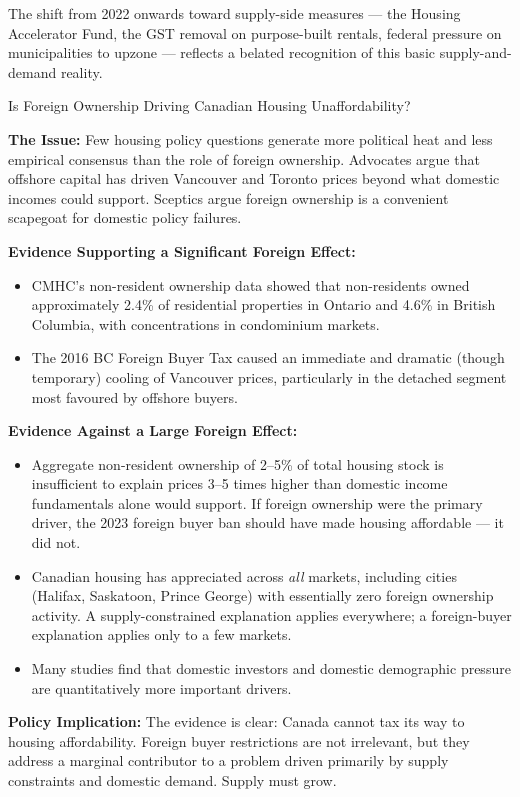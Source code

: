 The shift from 2022 onwards toward supply-side measures --- the Housing
Accelerator Fund, the GST removal on purpose-built rentals, federal pressure
on municipalities to upzone --- reflects a belated recognition of this basic
supply-and-demand reality.

\begin{policydebate}{Is Foreign Ownership Driving Canadian Housing Unaffordability?}

\textbf{The Issue:} Few housing policy questions generate more political
heat and less empirical consensus than the role of foreign ownership. Advocates
argue that offshore capital has driven Vancouver and Toronto prices beyond
what domestic incomes could support. Sceptics argue foreign ownership is a
convenient scapegoat for domestic policy failures.

\textbf{Evidence Supporting a Significant Foreign Effect:}
\begin{itemize}
  \item CMHC's non-resident ownership data showed that non-residents owned
        approximately 2.4\% of residential properties in Ontario and 4.6\%
        in British Columbia, with concentrations in condominium markets.
  \item The 2016 BC Foreign Buyer Tax caused an immediate and dramatic
        (though temporary) cooling of Vancouver prices, particularly in
        the detached segment most favoured by offshore buyers.
\end{itemize}

\textbf{Evidence Against a Large Foreign Effect:}
\begin{itemize}
  \item Aggregate non-resident ownership of 2--5\% of total housing
        stock is insufficient to explain prices 3--5 times higher
        than domestic income fundamentals alone would support. If foreign
        ownership were the primary driver, the 2023 foreign buyer ban
        should have made housing affordable --- it did not.
  \item Canadian housing has appreciated across \textit{all} markets,
        including cities (Halifax, Saskatoon, Prince George) with essentially
        zero foreign ownership activity. A supply-constrained explanation
        applies everywhere; a foreign-buyer explanation applies only to
        a few markets.
  \item Many studies find that domestic investors and domestic demographic
        pressure are quantitatively more important drivers.
\end{itemize}

\textbf{Policy Implication:} The evidence is clear: Canada cannot tax its
way to housing affordability. Foreign buyer restrictions are not irrelevant,
but they address a marginal contributor to a problem driven primarily by
supply constraints and domestic demand. Supply must grow.
\end{policydebate}

